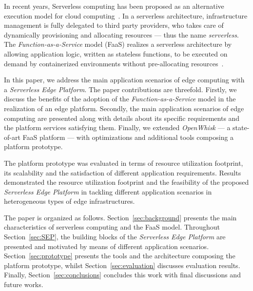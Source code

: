 In recent years, Serverless computing has been proposed as an alternative execution model for cloud computing~\cite{Lloyd18serverless}. In a serverless architecture, infrastructure management is fully delegated to third party providers, who takes care of dynamically provisioning and allocating resources --- thus the name \textit{serverless}. The \textit{Function-as-a-Service} model (FaaS) realizes a serverless architecture by allowing application logic, written as stateless functions, to be executed on demand by containerized environments without pre-allocating resources~\cite{Roberts:2018}. 

In this paper, we address the main application scenarios of edge computing with a \textit{Serverless Edge Platform}. The paper contributions are threefold. Firstly, we discuss the benefits of the adoption of the \textit{Function-as-a-Service} model in the realization of an edge platform. Secondly, the main application scenarios of edge computing are presented along with details about its specific requirements and the platform services satisfying them. Finally, we extended \textit{OpenWhisk} --- a state-of-art FaaS platform --- with optimizations and additional tools composing a platform prototype. 

The platform prototype was evaluated in terms of resource utilization footprint, its scalability and the satisfaction of different application requirements. Results demonstrated the resource utilization footprint
and the feasibility of the proposed \textit{Serverless Edge Platform} in tackling different application scenarios in heterogeneous types of edge infrastructures.



The paper is organized as follows. Section~\ref{sec:background} presents the main characteristics of serverless computing and the FaaS model.
Throughout Section~\ref{sec:SEP}, the building blocks of the \textit{Serverless Edge Platform} are presented and motivated by means of different application scenarios. Section~\ref{sec:prototype} presents the tools and the architecture composing the platform prototype, whilst Section~\ref{sec:evaluation} discusses evaluation results. Finally, Section~\ref{sec:conclusions} concludes this work with final discussions and future works.

